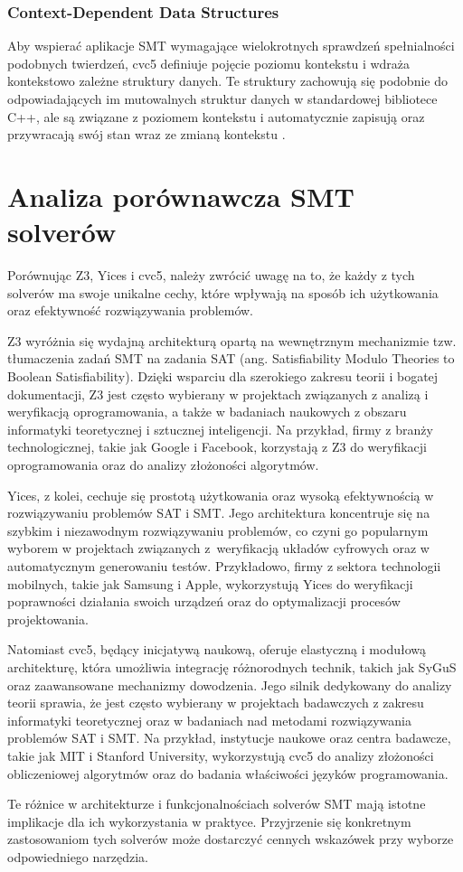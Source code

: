 \subsubsection{Context-Dependent Data Structures} Aby wspierać aplikacje SMT wymagające wielokrotnych sprawdzeń spełnialności podobnych twierdzeń, cvc5 definiuje pojęcie poziomu kontekstu i wdraża kontekstowo zależne struktury danych. Te struktury zachowują się podobnie do odpowiadających im mutowalnych struktur danych w standardowej bibliotece C++, ale są związane z poziomem kontekstu i automatycznie zapisują oraz przywracają swój stan wraz ze zmianą kontekstu \cite{BarbosaBBKLMMMN22}.

\section{Analiza porównawcza SMT solverów}

Porównując Z3, Yices i cvc5, należy zwrócić uwagę na to, że każdy z tych solverów ma swoje unikalne cechy, które wpływają na sposób ich użytkowania oraz efektywność rozwiązywania problemów.

Z3 wyróżnia się wydajną architekturą opartą na wewnętrznym mechanizmie tzw. tłumaczenia zadań SMT na zadania SAT (ang. Satisfiability Modulo Theories to Boolean Satisfiability). Dzięki wsparciu dla szerokiego zakresu teorii i bogatej dokumentacji, Z3 jest często wybierany w projektach związanych z analizą i weryfikacją oprogramowania, a także w badaniach naukowych z obszaru informatyki teoretycznej i sztucznej inteligencji. Na przykład, firmy z branży technologicznej, takie jak Google i Facebook, korzystają z Z3 do weryfikacji oprogramowania oraz do analizy złożoności algorytmów.

Yices, z kolei, cechuje się prostotą użytkowania oraz wysoką efektywnością w rozwiązywaniu problemów SAT i SMT. Jego architektura koncentruje się na szybkim i niezawodnym rozwiązywaniu problemów, co czyni go popularnym wyborem w projektach związanych z~weryfikacją układów cyfrowych oraz w automatycznym generowaniu testów. Przykładowo, firmy z sektora technologii mobilnych, takie jak Samsung i Apple, wykorzystują Yices do weryfikacji poprawności działania swoich urządzeń oraz do optymalizacji procesów projektowania.

Natomiast cvc5, będący inicjatywą naukową, oferuje elastyczną i modułową architekturę, która umożliwia integrację różnorodnych technik, takich jak SyGuS oraz zaawansowane mechanizmy dowodzenia.  Jego silnik dedykowany do analizy teorii sprawia, że jest często wybierany w projektach badawczych z zakresu informatyki teoretycznej oraz w badaniach nad metodami rozwiązywania problemów SAT i SMT. Na przykład, instytucje naukowe oraz centra badawcze, takie jak MIT i Stanford University, wykorzystują cvc5 do analizy złożoności obliczeniowej algorytmów oraz do badania właściwości języków programowania.

Te różnice w architekturze i funkcjonalnościach solverów SMT mają istotne implikacje dla ich wykorzystania w praktyce. Przyjrzenie się konkretnym zastosowaniom tych solverów może dostarczyć cennych wskazówek przy wyborze odpowiedniego narzędzia.

